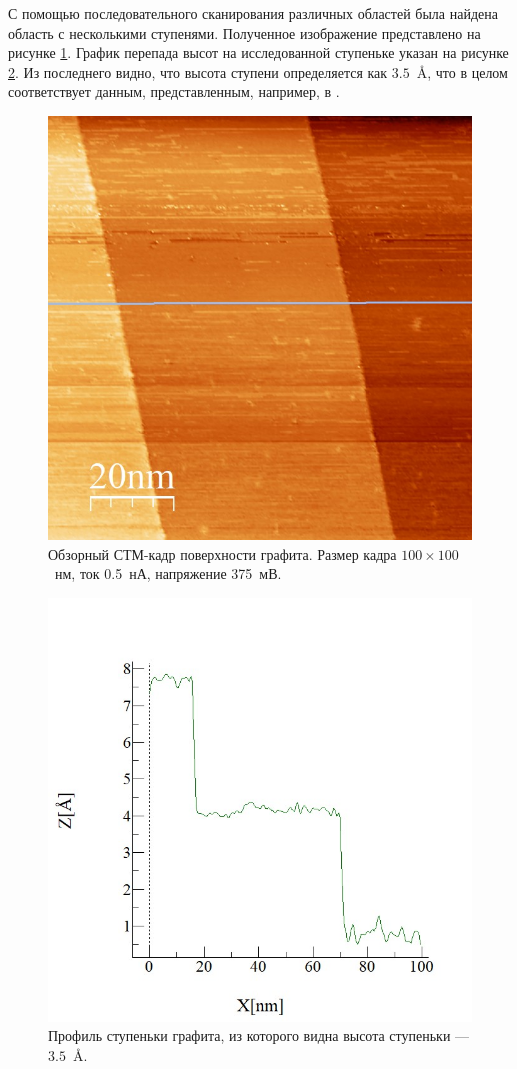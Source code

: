 \documentclass[a4paper, 12pt]{article}
\begin{document}
С помощью последовательного сканирования различных областей была найдена область с несколькими ступенями. Полученное изображение представлено на рисунке \ref{fig:2_step}. График перепада высот на исследованной ступеньке указан на рисунке \ref{fig:2_step_anal}. Из последнего видно, что высота ступени определяется как $3.5$~\AA, что в целом соответствует данным, представленным, например, в \cite{Article}.

\begin{figure}[H]
	\centering
	\includegraphics[width=0.58\linewidth]{../STM_data/Step/Step_final}
	\caption{Обзорный СТМ-кадр поверхности графита. Размер кадра $100\times100$~нм, ток 0.5~нА, напряжение 375~мВ.}
	\label{fig:2_step}
\end{figure}

\begin{figure}[H]
	\centering
	\includegraphics[width=0.6\linewidth]{../STM_data/Step/Step_final_Graph_enh.jpg}
	\caption{Профиль ступеньки графита, из которого видна высота ступеньки --- $3.5$~\AA.}
	\label{fig:2_step_anal}
\end{figure}
\end{document}
